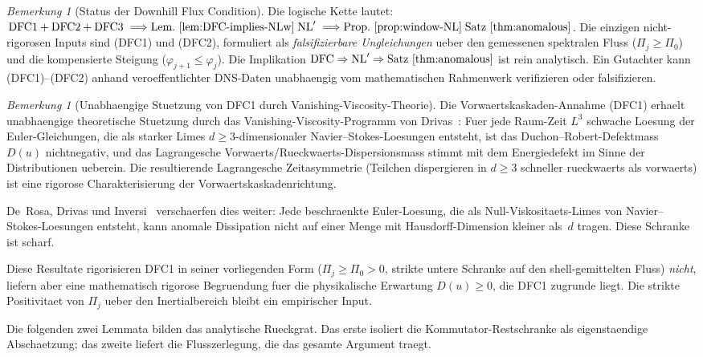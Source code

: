 \documentclass[12pt,a4paper]{article}
\theoremstyle{definition}
\theoremstyle{plain}
\theoremstyle{remark}
\newtheorem{remark}[definition]{Bemerkung}
\begin{document}
\begin{remark}[Status der Downhill Flux Condition]
\medskip\noindent
Die logische Kette lautet:
$\textup{DFC1} + \textup{DFC2} + \textup{DFC3}
\;\Longrightarrow{\text{Lem.~\ref{lem:DFC-implies-NLw}}}\;
\textup{NL}'
\;\Longrightarrow{\text{Prop.~\ref{prop:window-NL}}}\;
\textup{Satz~\ref{thm:anomalous}}$.
Die einzigen nicht-rigorosen Inputs sind (DFC1) und (DFC2), formuliert als
\emph{falsifizierbare Ungleichungen} ueber den gemessenen spektralen Fluss
($\Pi_j \ge \Pi_0$) und die kompensierte Steigung ($\varphi_{j+1} \le
\varphi_j$). Die Implikation $\textup{DFC} \Rightarrow \textup{NL}'
\Rightarrow \textup{Satz~\ref{thm:anomalous}}$ ist rein analytisch.
Ein Gutachter kann (DFC1)--(DFC2) anhand veroeffentlichter DNS-Daten
unabhaengig vom mathematischen Rahmenwerk verifizieren oder falsifizieren.
\end{remark}

\begin{remark}[Unabhaengige Stuetzung von DFC1 durch Vanishing-Viscosity-Theorie]
\label{rem:Drivas-VV}
Die Vorwaertskaskaden-Annahme (DFC1) erhaelt unabhaengige theoretische
Stuetzung durch das Vanishing-Viscosity-Programm von
Drivas~\cite{Drivas2019cascade}:
Fuer jede Raum-Zeit $L^3$ schwache Loesung der Euler-Gleichungen, die als
starker Limes $d\ge 3$-dimensionaler Navier--Stokes-Loesungen entsteht, ist
das Duchon--Robert-Defektmass $D(u)$ nichtnegativ, und das Lagrangesche
Vorwaerts/Rueckwaerts-Dispersionsmass stimmt mit dem Energiedefekt im Sinne
der Distributionen ueberein. Die resultierende Lagrangesche Zeitasymmetrie
(Teilchen dispergieren in $d\ge 3$ schneller rueckwaerts als vorwaerts) ist
eine rigorose Charakterisierung der Vorwaertskaskadenrichtung.

De~Rosa, Drivas und Inversi~\cite{DeRosaDrivasInversi2024} verschaerfen dies
weiter: Jede beschraenkte Euler-Loesung, die als Null-Viskositaets-Limes von
Navier--Stokes-Loesungen entsteht, kann anomale Dissipation nicht auf einer
Menge mit Hausdorff-Dimension kleiner als~$d$ tragen. Diese Schranke ist scharf.

Diese Resultate rigorisieren DFC1 in seiner vorliegenden Form
($\Pi_j \ge \Pi_0 > 0$, strikte untere Schranke auf den shell-gemittelten Fluss)
\emph{nicht}, liefern aber eine mathematisch rigorose Begruendung fuer die
physikalische Erwartung $D(u) \ge 0$, die DFC1 zugrunde liegt. Die strikte
Positivitaet von $\Pi_j$ ueber den Inertialbereich bleibt ein empirischer Input.
\end{remark}

Die folgenden zwei Lemmata bilden das analytische Rueckgrat. Das erste
isoliert die Kommutator-Restschranke als eigenstaendige Abschaetzung; das
zweite liefert die Flusszerlegung, die das gesamte Argument traegt.
\end{document}
